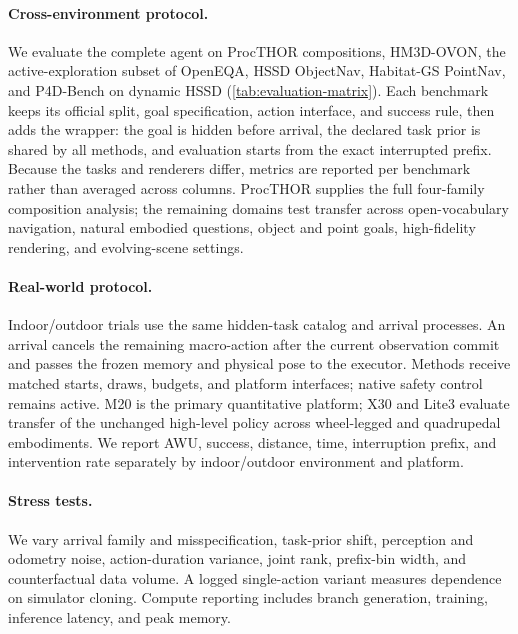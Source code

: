 \paragraph{Cross-environment protocol.}
We evaluate the complete agent on ProcTHOR \taskname{} compositions, HM3D-OVON, the active-exploration subset of OpenEQA, HSSD ObjectNav, Habitat-GS PointNav, and P4D-Bench on dynamic HSSD (\cref{tab:evaluation-matrix}).
Each benchmark keeps its official split, goal specification, action interface, and success rule, then adds the \taskname{} wrapper: the goal is hidden before arrival, the declared task prior is shared by all methods, and evaluation starts from the exact interrupted prefix.
Because the tasks and renderers differ, metrics are reported per benchmark rather than averaged across columns.
ProcTHOR supplies the full four-family composition analysis; the remaining domains test transfer across open-vocabulary navigation, natural embodied questions, object and point goals, high-fidelity rendering, and evolving-scene settings.

\paragraph{Real-world protocol.}
Indoor/outdoor trials use the same hidden-task catalog and arrival processes.
An arrival cancels the remaining macro-action after the current observation commit and passes the frozen memory and physical pose to the executor.
Methods receive matched starts, draws, budgets, and platform interfaces; native safety control remains active.
M20 is the primary quantitative platform; X30 and Lite3 evaluate transfer of the unchanged high-level policy across wheel-legged and quadrupedal embodiments.
We report AWU, success, distance, time, interruption prefix, and intervention rate separately by indoor/outdoor environment and platform.

\paragraph{Stress tests.}
We vary arrival family and misspecification, task-prior shift, perception and odometry noise, action-duration variance, joint rank, prefix-bin width, and counterfactual data volume.
A logged single-action variant measures dependence on simulator cloning.
Compute reporting includes branch generation, training, inference latency, and peak memory.
